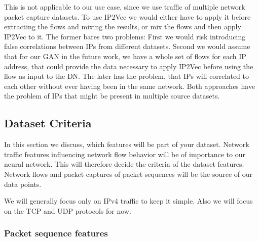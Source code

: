 \documentclass[
	ngerman,
	ruledheaders=section,%
	class=report,%
	thesis={type=bachelor},%
	accentcolor=9c,%
	custommargins=true,%
	marginpar=false,%
	parskip=half-,%
	fontsize=11pt,%
]{tudapub}
\begin{document}
This is not applicable to our use case, since we use traffic of multiple network packet capture datasets.
To use IP2Vec we would either have to apply it before extracting the flows and mixing the results,
or mix the flows and then apply IP2Vec to it.
The former bares two problems:
First we would risk introducing false correlations between IPs from different datasets.
Second we would assume that for our GAN in the future work, we have a whole set of flows for each IP address, that could provide the data necessary to apply IP2Vec before using the flow as input to the DN.
The later has the problem, that IPs will correlated to each other without ever having been in the same network.
Both approaches have the problem of IPs that might be present in multiple source datasets.

\subsection{Dataset Criteria}

In this section we discuss, which features will be part of your dataset. %
Network traffic features influencing network flow behavior will be of importance to our neural network.
This will therefore decide the criteria of the dataset features.
Network flows and packet captures of packet sequences will be the source of our data points.

We will generally focus only on IPv4 traffic to keep it simple.
Also we will focus on the TCP and UDP protocols for now.


\subsubsection{Packet sequence features}

\end{document}
